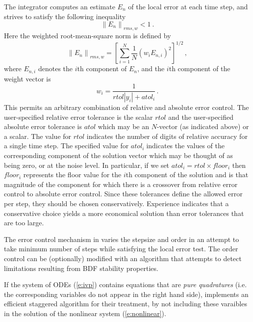 The integrator computes an estimate $E_{n}$ of the local error at each time
step, and strives to satisfy the following inequality
\begin{equation*}%
\left\| E_n\right\|_{rms,w} < 1 ~.
\end{equation*}
Here the weighted root-mean-square norm is defined by
\begin{equation}\label{e:rms}
\left\| E_n\right\|_{rms,w}=\left[ \sum_{i=1}^N\frac{1}{N}\left(
w_iE_{n,i}\right) ^2\right] ^{1/2} \, ,
\end{equation}
where $E_{n,i}$ denotes the $i$th component of $E_n$, and the $i$th 
component of the weight vector is 
\begin{equation}\label{e:weight}
w_i=\frac{1}{rtol|y_i|+atol_i} \,.
\end{equation}
This permits an arbitrary combination of relative and absolute error control.
The user-specified relative error tolerance is the scalar $rtol$ and the
user-specified absolute error tolerance is $atol$ which may be an $N$-vector
(as indicated above) or a scalar. The value for $rtol$
indicates the number of digits of relative accuracy for a single time step.
The specified value for $atol_{i}\;$indicates the values of the
corresponding component of the solution vector which may be thought of as
being zero, or at the noise level. In particular, if we set 
$atol_i=rtol\times floor_i$ then $floor_i$ represents the floor value for the 
$i$th component of the solution and is that magnitude of the component for
which there is a crossover from relative error control to absolute error
control. Since these tolerances define the allowed error per step, they
should be chosen conservatively. Experience indicates that a conservative
choice yields a more economical solution than error tolerances that are too
large.

The error control mechanism in {\cvodes} varies the stepsize and order
in an attempt to take minimum number of steps while satisfying the local
error test. The order control can be (optionally) modified with an algorithm
that attempts to detect limitations resulting from BDF stability properties.

If the system of ODEs (\ref{e:ivp}) contains equations that are {\em pure quadratures}
(i.e. the corresponding variables do not appear in the right hand side),
{\cvodes} implements an efficient staggered algorithm for their treatment, by not
including these varaibles in the solution of the nonlinear system (\ref{e:nonlinear}).

